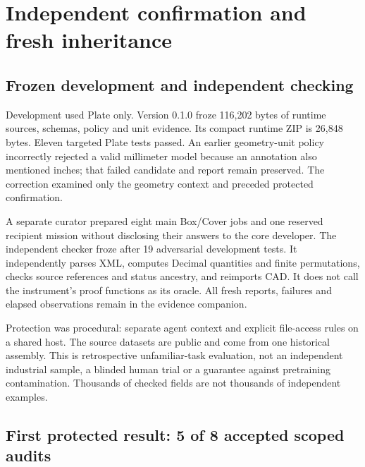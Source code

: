 \documentclass[
  11pt,
]{article}
\let\OriginalSection\section
\renewcommand{\section}{\needspace{5\baselineskip}\OriginalSection}
\let\OriginalSubsection\subsection
\renewcommand{\subsection}{\needspace{6\baselineskip}\OriginalSubsection}
\begin{document}
\hypertarget{independent-confirmation-and-fresh-inheritance}{%
\section{Independent confirmation and fresh
inheritance}\label{independent-confirmation-and-fresh-inheritance}}

\hypertarget{frozen-development-and-independent-checking}{%
\subsection{Frozen development and independent
checking}\label{frozen-development-and-independent-checking}}

Development used Plate only. Version 0.1.0 froze 116,202 bytes of
runtime sources, schemas, policy and unit evidence. Its compact runtime
ZIP is 26,848 bytes. Eleven targeted Plate tests passed. An earlier
geometry-unit policy incorrectly rejected a valid millimeter model
because an annotation also mentioned inches; that failed candidate and
report remain preserved. The correction examined only the geometry
context and preceded protected confirmation.

A separate curator prepared eight main Box/Cover jobs and one reserved
recipient mission without disclosing their answers to the core
developer. The independent checker froze after 19 adversarial
development tests. It independently parses XML, computes Decimal
quantities and finite permutations, checks source references and status
ancestry, and reimports CAD. It does not call the instrument's proof
functions as its oracle. All fresh reports, failures and elapsed
observations remain in the evidence companion.

Protection was procedural: separate agent context and explicit
file-access rules on a shared host. The source datasets are public and
come from one historical assembly. This is retrospective unfamiliar-task
evaluation, not an independent industrial sample, a blinded human trial
or a guarantee against pretraining contamination. Thousands of checked
fields are not thousands of independent examples.

\hypertarget{first-protected-result-5-of-8-accepted-scoped-audits}{%
\subsection{First protected result: 5 of 8 accepted scoped
audits}\label{first-protected-result-5-of-8-accepted-scoped-audits}}
\end{document}
